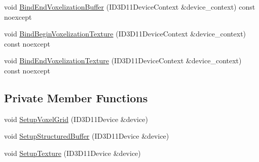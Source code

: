 \begin{DoxyCompactItemize}
\item 
void \mbox{\hyperlink{classmage_1_1rendering_1_1_voxel_grid_a2da6ce7a6880b1fc65b36757d8111062}{Bind\+End\+Voxelization\+Buffer}} (I\+D3\+D11\+Device\+Context \&device\+\_\+context) const noexcept
\item 
void \mbox{\hyperlink{classmage_1_1rendering_1_1_voxel_grid_a00fa75aaed950df37be237c9b8557eeb}{Bind\+Begin\+Voxelization\+Texture}} (I\+D3\+D11\+Device\+Context \&device\+\_\+context) const noexcept
\item 
void \mbox{\hyperlink{classmage_1_1rendering_1_1_voxel_grid_ac404f5cb8fd1293e2351ae6106f37fe5}{Bind\+End\+Voxelization\+Texture}} (I\+D3\+D11\+Device\+Context \&device\+\_\+context) const noexcept
\end{DoxyCompactItemize}
\subsection*{Private Member Functions}
\begin{DoxyCompactItemize}
\item 
void \mbox{\hyperlink{classmage_1_1rendering_1_1_voxel_grid_af7796e22a1a02c50c77b2c8d40d800c0}{Setup\+Voxel\+Grid}} (I\+D3\+D11\+Device \&device)
\item 
void \mbox{\hyperlink{classmage_1_1rendering_1_1_voxel_grid_a8f24eca860d059316a1aa40f2e878ecc}{Setup\+Structured\+Buffer}} (I\+D3\+D11\+Device \&device)
\item 
void \mbox{\hyperlink{classmage_1_1rendering_1_1_voxel_grid_aa9b3ab18a4741ab9aa007965a43224eb}{Setup\+Texture}} (I\+D3\+D11\+Device \&device)
\end{DoxyCompactItemize}
